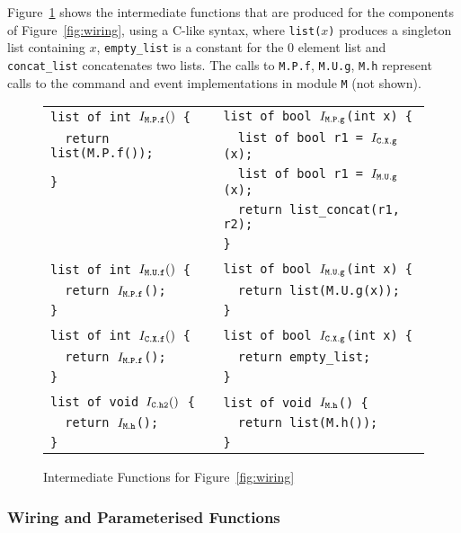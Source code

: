 \documentclass[11pt,letterpaper]{article}
\newcommand{\code}[1]{{\tt #1}}
\begin{document}
Figure~\ref{fig:wiring-fns} shows the intermediate functions that are
produced for the components of Figure~\ref{fig:wiring}, using a C-like
syntax, where \code{list($x$)} produces a singleton list containing $x$,
\code{empty\_list} is a constant for the 0 element list and
\code{concat\_list} concatenates two lists. The calls to \code{M.P.f},
\code{M.U.g}, \code{M.h} represent calls to the command and event
implementations in module \code{M} (not shown).

\begin{figure}
\begin{tabular}{ll}
\tt list of int $I_\code{M.P.f}()$ \{ & \tt list of bool $I_\code{M.P.g}$(int x) \{ \\
\tt \ \ return list(M.P.f());         & \tt \ \ list of bool r1 = $I_\code{C.X.g}$(x); \\
\tt \}                                & \tt \ \ list of bool r1 = $I_\code{M.U.g}$(x); \\
                                      & \tt \ \ return list\_concat(r1, r2); \\
                                      & \tt \} \\
\\
\tt list of int $I_\code{M.U.f}()$ \{ & \tt list of bool $I_\code{M.U.g}$(int x) \{ \\
\tt \ \ return $I_\code{M.P.f}$();    & \tt \ \ return list(M.U.g(x)); \\
\tt \}                                & \tt \} \\
\\
\tt list of int $I_\code{C.X.f}()$ \{ & \tt list of bool $I_\code{C.X.g}$(int x) \{ \\
\tt \ \ return $I_\code{M.P.f}$();    & \tt \ \ return empty\_list; \\
\tt \}                                & \tt \} \\
\\
\tt list of void $I_\code{C.h2}()$ \{ & \tt list of void $I_\code{M.h}$() \{ \\
\tt \ \ return $I_\code{M.h}$();      & \tt \ \ return list(M.h()); \\
\tt \}                                & \tt \} \\
\end{tabular}
\caption{Intermediate Functions for Figure~\ref{fig:wiring}}
\label{fig:wiring-fns}
\end{figure}

\subsubsection{Wiring and Parameterised Functions}
\label{sec:wiring-parms}
\end{document}
